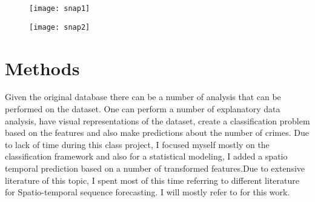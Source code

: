 \documentclass[conference]{IEEEtran}
\begin{document}
  
	\begin{figure}[H]		
	\texttt{[image: snap1]} 
	
\end{figure}
	\begin{figure}[H]		
	\texttt{[image: snap2]} 
	
\end{figure}
   
\section{Methods}
Given the original database there can be a number of analysis that can be performed on the dataset. One can perform a number of explanatory data analysis, have visual representations of the dataset, create a classification problem based on the features and also make predictions about the number of crimes. Due to lack of time during this class project, I focused myself mostly on the classification framework and also for a statistical modeling, I added a spatio temporal prediction based on a number of transformed features.Due to extensive literature of this topic, I spent most of this time referring to different literature for Spatio-temporal sequence forecasting. I will mostly refer to \cite{b12,b13} for this work.\\
\end{document}
